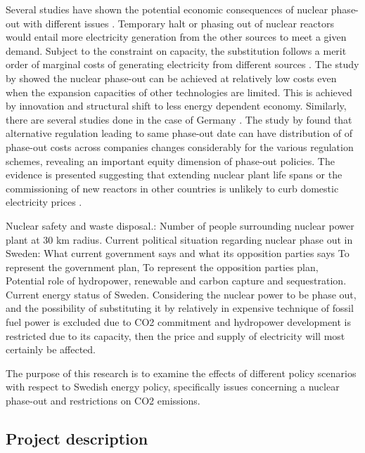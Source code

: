 \documentclass[10pt,a4paper]{article}
\begin{document}
Several studies have shown the potential economic consequences of nuclear phase-out with different issues \citep{Bohringer2002, Nestle2012, Bretschger2012, Duscha0, Glomsrod2013}. Temporary halt or phasing out of nuclear reactors would entail more electricity generation from the other sources to meet a given demand. Subject to the constraint on capacity, the substitution follows a merit order of marginal costs of generating electricity from different sources \citep{Glomsrod2013}. The study by \cite{Bretschger2012} showed the nuclear phase-out can be achieved at relatively low costs even when the expansion capacities of other technologies are limited. This is achieved by innovation and structural shift to less energy dependent economy. Similarly, there are several studies done in the case of Germany \citep{Bohringer2002, Nestle2012}. The study by \cite{Bohringer2002} found that alternative regulation leading to same phase-out date can have distribution of of phase-out costs across companies changes considerably for the various regulation schemes, revealing an important equity dimension of phase-out policies. The evidence is presented suggesting that extending nuclear plant life spans or the commissioning of new reactors in other countries is unlikely to curb domestic electricity prices \citep{Nestle2012}.


Nuclear safety and waste disposal.: Number of people surrounding nuclear power plant at 30 km radius.
Current political situation regarding nuclear phase out in Sweden: What current government says and what its opposition parties says
To represent the government plan,
To represent the opposition parties plan,
Potential role of hydropower, renewable and carbon capture and sequestration.
Current energy status of Sweden.
Considering the nuclear power to be phase out, and the possibility of substituting it by relatively in expensive technique of fossil fuel power is excluded due to CO2 commitment and hydropower development is restricted due to its capacity, then the price and supply of electricity will most certainly be affected.

The purpose of this research is to examine the effects of different policy scenarios with respect to Swedish energy policy, specifically issues concerning a nuclear phase-out and restrictions on CO2 emissions.



\subsection{Project description}
\end{document}
